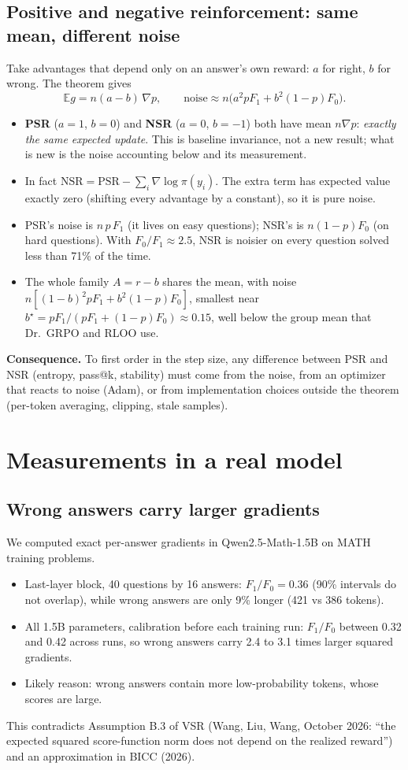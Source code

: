 \documentclass[11pt]{article}
\newcommand{\E}{\mathbb{E}}
\begin{document}
\subsection{Positive and negative reinforcement: same mean, different noise}
Take advantages that depend only on an answer's own reward: $a$ for right, $b$ for wrong. The theorem gives
\[
\E g = n(a-b)\,\nabla p,\qquad \text{noise}\approx n\big(a^2pF_1+b^2(1-p)F_0\big).
\]
\begin{itemize}[leftmargin=*,itemsep=1pt]
\item \textbf{PSR} ($a=1$, $b=0$) and \textbf{NSR} ($a=0$, $b=-1$) both have mean $n\nabla p$: \emph{exactly the same expected update}. This is baseline invariance, not a new result; what is new is the noise accounting below and its measurement.
\item In fact $\text{NSR} = \text{PSR} - \sum_i\nabla\log\pi(y_i)$. The extra term has expected value exactly zero (shifting every advantage by a constant), so it is pure noise.
\item PSR's noise is $n\,p\,F_1$ (it lives on easy questions); NSR's is $n(1-p)F_0$ (on hard questions). With $F_0/F_1\approx2.5$, NSR is noisier on every question solved less than 71\% of the time.
\item The whole family $A=r-b$ shares the mean, with noise $n[(1-b)^2pF_1+b^2(1-p)F_0]$, smallest near $b^\star=pF_1/(pF_1+(1-p)F_0)\approx0.15$, well below the group mean that Dr.\ GRPO and RLOO use.
\end{itemize}
\textbf{Consequence.} To first order in the step size, any difference between PSR and NSR (entropy, pass@k, stability) must come from the noise, from an optimizer that reacts to noise (Adam), or from implementation choices outside the theorem (per-token averaging, clipping, stale samples).

\section{Measurements in a real model}

\subsection{Wrong answers carry larger gradients}
We computed exact per-answer gradients in Qwen2.5-Math-1.5B on MATH training problems.
\begin{itemize}[leftmargin=*,itemsep=1pt]
\item Last-layer block, 40 questions by 16 answers: $F_1/F_0=0.36$ (90\% intervals do not overlap), while wrong answers are only 9\% longer (421 vs 386 tokens).
\item All 1.5B parameters, calibration before each training run: $F_1/F_0$ between 0.32 and 0.42 across runs, so wrong answers carry 2.4 to 3.1 times larger squared gradients.
\item Likely reason: wrong answers contain more low-probability tokens, whose scores are large.
\end{itemize}
This contradicts Assumption B.3 of VSR (Wang, Liu, Wang, October 2026: ``the expected squared score-function norm does not depend on the realized reward'') and an approximation in BICC (2026).
\end{document}
